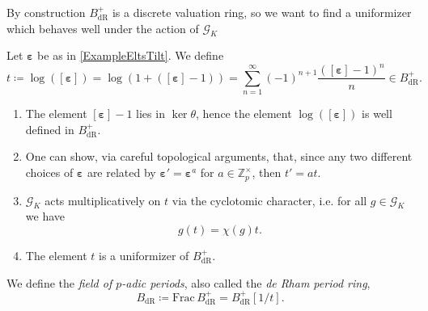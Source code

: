 \noindent
By construction $B_{\mathrm{dR}}^+$ is a discrete valuation ring,
so we want to find a uniformizer which behaves well under the action of $\mathscr{G}_K$
\begin{defn}[]
	Let $\boldsymbol\varepsilon$ be as in \cref{ExampleEltsTilt}.
	We define
	\begin{equation*}
		t \coloneqq \log \left( [\boldsymbol\varepsilon] \right) =
		\log \left( 1 + ([\boldsymbol\varepsilon] - 1)\right) =
		\sum_{n = 1 }^{ \infty } (-1)^{n+1} 
		\frac{ ([\boldsymbol\varepsilon] - 1)^n }{ n }
		\in B_{\mathrm{dR}}^+
	.\end{equation*}
\end{defn}


\begin{rem}\leavevmode\vspace{-0.2\baselineskip}
\begin{enumerate}
	\item The element $[\boldsymbol\varepsilon] - 1 $ lies in
		$\ker \theta$, hence the element $\log ([\boldsymbol\varepsilon])$
		is well defined in $B_{\mathrm{dR}}^+$.

	\item One can show, via careful topological arguments, that,
		since any two different choices of $\boldsymbol\varepsilon$
		are related by $\boldsymbol\varepsilon' = \boldsymbol\varepsilon^a$
		for $a \in \mathbb{Z}_{p}^{\times}$, then
		$t' = a t$.

	\item $\mathscr{G}_K$ acts multiplicatively on $t$ via the cyclotomic character,
		i.e. for all $g \in \mathscr{G}_K$ we have
		\begin{equation*}
		g(t) = \chi(g) t
		.\end{equation*}

	\item The element $t$ is a uniformizer of $B_{\mathrm{dR}}^+$.
\end{enumerate}
\end{rem}


\begin{defn}
	We define the \emph{field of $p$-adic periods}, also called
	the \emph{de Rham period ring},
	\begin{equation*}
	B_{\mathrm{dR}} \coloneqq \mathrm{Frac}\, B_{\mathrm{dR}}^+ =
	B_{\mathrm{dR}}^+[1/t]
	.\end{equation*}
\end{defn}


